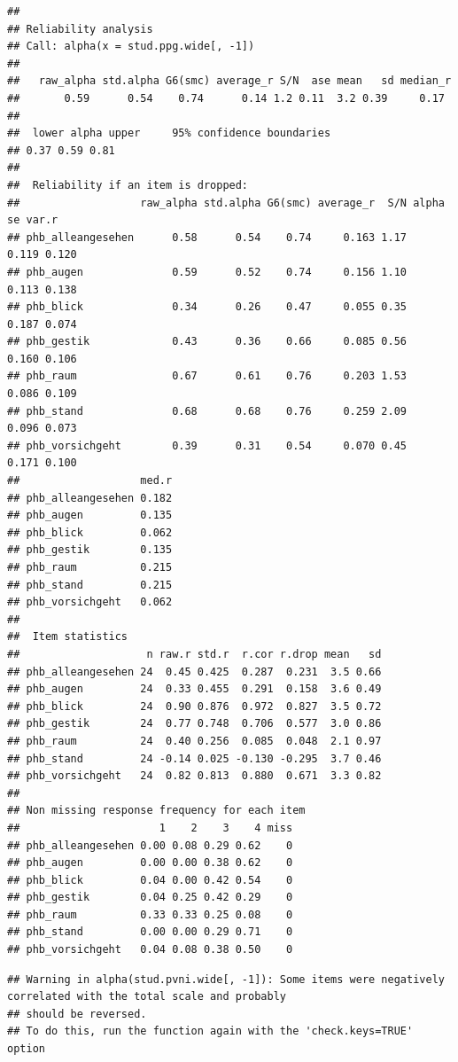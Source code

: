 \documentclass[
  english,
  man,floatsintext]{apa6}
\begin{document}
\begin{verbatim}
## 
## Reliability analysis   
## Call: alpha(x = stud.ppg.wide[, -1])
## 
##   raw_alpha std.alpha G6(smc) average_r S/N  ase mean   sd median_r
##       0.59      0.54    0.74      0.14 1.2 0.11  3.2 0.39     0.17
## 
##  lower alpha upper     95% confidence boundaries
## 0.37 0.59 0.81 
## 
##  Reliability if an item is dropped:
##                   raw_alpha std.alpha G6(smc) average_r  S/N alpha se var.r
## phb_alleangesehen      0.58      0.54    0.74     0.163 1.17    0.119 0.120
## phb_augen              0.59      0.52    0.74     0.156 1.10    0.113 0.138
## phb_blick              0.34      0.26    0.47     0.055 0.35    0.187 0.074
## phb_gestik             0.43      0.36    0.66     0.085 0.56    0.160 0.106
## phb_raum               0.67      0.61    0.76     0.203 1.53    0.086 0.109
## phb_stand              0.68      0.68    0.76     0.259 2.09    0.096 0.073
## phb_vorsichgeht        0.39      0.31    0.54     0.070 0.45    0.171 0.100
##                   med.r
## phb_alleangesehen 0.182
## phb_augen         0.135
## phb_blick         0.062
## phb_gestik        0.135
## phb_raum          0.215
## phb_stand         0.215
## phb_vorsichgeht   0.062
## 
##  Item statistics 
##                    n raw.r std.r  r.cor r.drop mean   sd
## phb_alleangesehen 24  0.45 0.425  0.287  0.231  3.5 0.66
## phb_augen         24  0.33 0.455  0.291  0.158  3.6 0.49
## phb_blick         24  0.90 0.876  0.972  0.827  3.5 0.72
## phb_gestik        24  0.77 0.748  0.706  0.577  3.0 0.86
## phb_raum          24  0.40 0.256  0.085  0.048  2.1 0.97
## phb_stand         24 -0.14 0.025 -0.130 -0.295  3.7 0.46
## phb_vorsichgeht   24  0.82 0.813  0.880  0.671  3.3 0.82
## 
## Non missing response frequency for each item
##                      1    2    3    4 miss
## phb_alleangesehen 0.00 0.08 0.29 0.62    0
## phb_augen         0.00 0.00 0.38 0.62    0
## phb_blick         0.04 0.00 0.42 0.54    0
## phb_gestik        0.04 0.25 0.42 0.29    0
## phb_raum          0.33 0.33 0.25 0.08    0
## phb_stand         0.00 0.00 0.29 0.71    0
## phb_vorsichgeht   0.04 0.08 0.38 0.50    0
\end{verbatim}

\begin{verbatim}
## Warning in alpha(stud.pvni.wide[, -1]): Some items were negatively correlated with the total scale and probably 
## should be reversed.  
## To do this, run the function again with the 'check.keys=TRUE' option
\end{verbatim}
\end{document}
